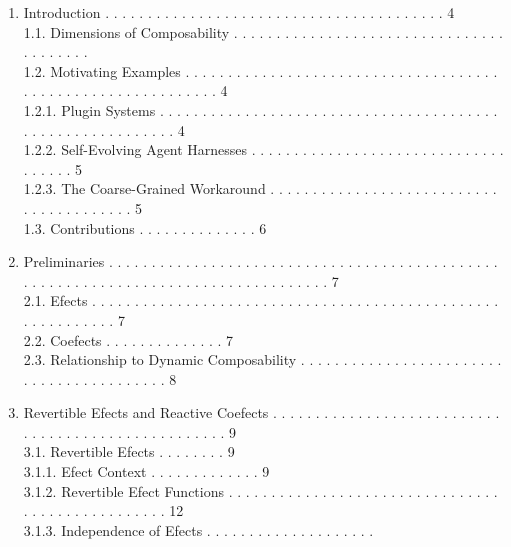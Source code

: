 \documentclass[
  10
]{article}
\providecommand{\tightlist}{%
  \setlength{\itemsep}{0pt}\setlength{\parskip}{0pt}}
\begin{document}
\begin{enumerate}
\def\labelenumi{\arabic{enumi}.}
\tightlist
\item
  Introduction . . . . . . . . . . . . . . . . . . . . . . . . . . . . .
  . . . . . . . . . . . 4\\
  1.1. Dimensions of Composability . . . . . . . . . . . . . . . . . . .
  . . . . . . . . . . . . . . . . . . . . .\\
  1.2. Motivating Examples . . . . . . . . . . . . . . . . . . . . . . .
  . . . . . . . . . . . . . . . . . . . . . . . . . . . . . . . . . . .
  . . 4\\
  1.2.1. Plugin Systems . . . . . . . . . . . . . . . . . . . . . . . .
  . . . . . . . . . . . . . . . . . . . . . . . . . . . . . . . . . .
  4\\
  1.2.2. Self-Evolving Agent Harnesses . . . . . . . . . . . . . . . . .
  . . . . . . . . . . . . . . . . . . . 5\\
  1.2.3. The Coarse-Grained Workaround . . . . . . . . . . . . . . . . .
  . . . . . . . . . . . . . . . . . . . . . . . 5\\
  1.3. Contributions . . . . . . . . . . . . . . 6\\
\item
  Preliminaries . . . . . . . . . . . . . . . . . . . . . . . . . . . .
  . . . . . . . . . . . . . . . . . . . . . . . . . . . . . . . . . . .
  . . . . . . . . . . . . . . . . . . . 7\\
  2.1. Efects . . . . . . . . . . . . . . . . . . . . . . . . . . . . .
  . . . . . . . . . . . . . . . . . . . . . . . . . . . . . . 7\\
  2.2. Coefects . . . . . . . . . . . . . . 7\\
  2.3. Relationship to Dynamic Composability . . . . . . . . . . . . . .
  . . . . . . . . . . . . . . . . . . . . . . . . . . . 8\\
\item
  Revertible Efects and Reactive Coefects . . . . . . . . . . . . . . .
  . . . . . . . . . . . . . . . . . . . . . . . . . . . . . . . . . . .
  . 9\\
  3.1. Revertible Efects . . . . . . . . 9\\
  3.1.1. Efect Context . . . . . . . . . . . . . 9\\
  3.1.2. Revertible Efect Functions . . . . . . . . . . . . . . . . . .
  . . . . . . . . . . . . . . . . . . . . . . . . . . . . . . . 12\\
  3.1.3. Independence of Efects . . . . . . . . . . . . . . . . . . . .

\end{enumerate}
\end{document}
